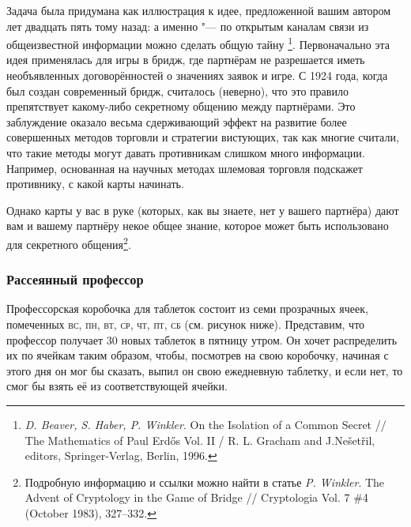 \documentclass[twoside]{book}
\begin{document}
Задача была придумана как иллюстрация к идее, предложенной вашим автором лет двадцать пять тому назад:
а именно "--- по открытым каналам связи из общеизвестной информации можно сделать общую тайну%
\footnote{\emph{D. Beaver, S. Haber, P. Winkler}. On the Isolation of a Common Secret /\!/ {The Mathematics of Paul Erd\H{o}s} Vol. II / R. L. Gracham and J.Ne\v{s}et\v{r}il, editors, Springer-Verlag, Berlin, 1996.}.
Первоначально эта идея применялась для игры в бридж, где партнёрам не разрешается иметь необъявленных договорённостей о значениях заявок и игре.
С 1924 года, когда был создан современный бридж, считалось (неверно), что это правило препятствует какому-либо секретному общению между партнёрами.
Это заблуждение оказало весьма сдерживающий эффект на развитие более совершенных методов торговли и стратегии вистующих, так как многие считали, что такие методы могут давать противникам слишком много информации.
Например, основанная на научных методах шлемовая торговля подскажет противнику, с какой карты начинать.

Однако карты у вас в руке (которых, как вы знаете, нет у вашего партнёра) дают вам и вашему партнёру некое общее знание, которое может быть использовано для секретного общения\footnote{
Подробную информацию и ссылки можно найти в статье \emph{P. Winkler}. The Advent of Cryptology in the Game of Bridge /\!/ {Cryptologia} Vol. 7 \#4 (October 1983),  327--332.}.

\subsubsection*{Рассеянный профессор}%

Профессорская коробочка для таблеток состоит из семи прозрачных ячеек, помеченных \textsc{вс}, \textsc{пн}, \textsc{вт}, \textsc{ср}, \textsc{чт}, \textsc{пт}, \textsc{сб} (см. рисунок ниже).
Представим, что профессор получает 30 новых таблеток в пятницу утром.
Он хочет распределить их по ячейкам таким образом, чтобы, посмотрев на свою коробочку, начиная с этого дня он мог бы сказать, выпил  он свою ежедневную таблетку, и если нет, то смог бы взять её из соответствующей ячейки.
\end{document}
